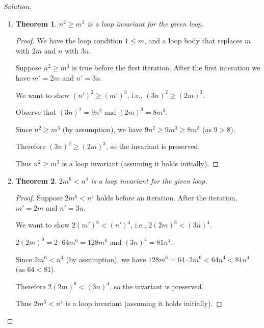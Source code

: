 \documentclass[12pt]{article}
\newtheorem*{theorem}{Theorem}
\begin{document}
\begin{proof}[Solution]
~
\begin{enumerate}[label=(\alph*)]
    \item 
    
    \begin{theorem}
    $n^2 \geq m^3$ is a loop invariant for the given loop.
    \end{theorem}
    
    \begin{proof}
    We have the loop condition $1 \leq m$, and a loop body  that replaces $m$ with $2m$ and $n$ with $3n$.
    
    Suppose $n^2 \geq m^3$ is true before the first iteration. After the first interation we have $m' = 2m$ and $n' = 3n$.
    
    We want to show $(n')^2 \geq (m')^3$, i.e., $(3n)^2 \geq (2m)^3$.
    
    Observe that $(3n)^2 = 9n^2$ and $(2m)^3 = 8m^3$.
    
    Since $n^2 \geq m^3$ (by assumption), we have $9n^2 \geq 9m^3 \geq 8m^3$ (as $9 > 8$).
    
    Therefore $(3n)^2 \geq (2m)^3$, so the invariant is preserved.
    
    Thus $n^2 \geq m^3$ is a loop invariant (assuming it holds initially).
    \end{proof}
    
    \item 
    
    \begin{theorem}
    $2m^6 < n^4$ is a loop invariant for the given loop.
    \end{theorem}
    
    \begin{proof}
    Suppose $2m^6 < n^4$ holds before an iteration. After the iteration, $m' = 2m$ and $n' = 3n$.
    
    We want to show $2(m')^6 < (n')^4$, i.e., $2(2m)^6 < (3n)^4$.
    
    $2(2m)^6 = 2 \cdot 64m^6 = 128m^6$ and $(3n)^4 = 81n^4$.
    
    Since $2m^6 < n^4$ (by assumption), we have $128m^6 = 64 \cdot 2m^6 < 64n^4 < 81n^4$ (as $64 < 81$).
    
    Therefore $2(2m)^6 < (3n)^4$, so the invariant is preserved.
    
    Thus $2m^6 < n^4$ is a loop invariant (assuming it holds initially).
    \end{proof}
\end{enumerate}
\renewcommand{\qedsymbol}{}
\end{proof}
\end{document}
